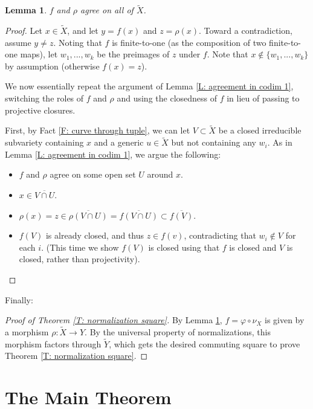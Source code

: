 \documentclass{amsart}
\newtheorem{lemma}[theorem]{Lemma}
\theoremstyle{definition}
\begin{document}
\begin{lemma}\label{L: two maps agree everywhere}
    $f$ and $\rho$ agree on all of $\widetilde X$.
\end{lemma}
\begin{proof}
    Let $x\in\widetilde X$, and let $y=f(x)$ and $z=\rho(x)$. Toward a contradiction, assume $y\neq z$. Noting that $f$ is finite-to-one (as the composition of two finite-to-one maps), let $w_1,...,w_k$ be the preimages of $z$ under $f$. Note that $x\notin\{w_1,...,w_k\}$ by assumption (otherwise $f(x)=z$).

    We now essentially repeat the argument of Lemma \ref{L: agreement in codim 1}, switching the roles of $f$ and $\rho$ and using the closedness of $f$ in lieu of passing to projective closures.
    
    First, by Fact \ref{F: curve through tuple}, we can let $V\subset\widetilde X$ be a closed irreducible subvariety containing $x$ and a generic $u\in\widetilde X$ but not containing any $w_i$. As in Lemma \ref{L: agreement in codim 1}, we argue the following:
    \begin{itemize}
        \item $f$ and $\rho$ agree on some open set $U$ around $x$.
        \item $x\in\overline{V\cap U}$.
        \item $\rho(x)=z\in\overline{\rho(V\cap U)}=\overline{f(V\cap U)}\subset\overline{f(V)}$.
        \item $f(V)$ is already closed, and thus $z\in f(v)$, contradicting that $w_i\notin V$ for each $i$. (This time we show $f(V)$ is closed using that $f$ is closed and $V$ is closed, rather than projectivity).
    \end{itemize}
\end{proof}

Finally:

\begin{proof}[Proof of Theorem \ref{T: normalization square}] By Lemma \ref{L: two maps agree everywhere}, $f=\varphi\circ\nu_X$ is given by a morphism $\rho:\widetilde X\rightarrow Y$. By the universal property of normalizations, this morphism factors through $\widetilde Y$, which gets the desired commuting square to prove Theorem \ref{T: normalization square}.
\end{proof}

\section{The Main Theorem}
\end{document}
